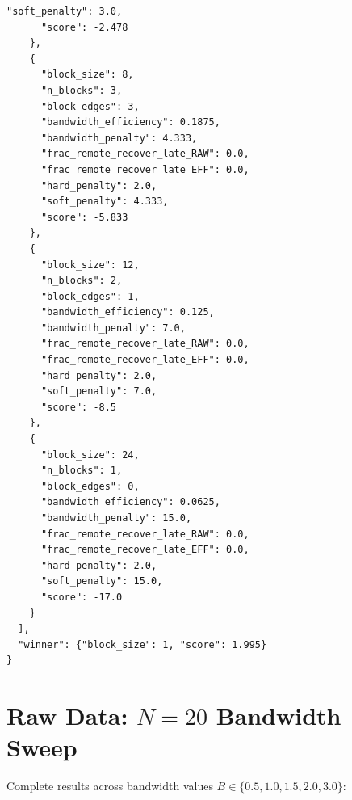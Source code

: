 \documentclass[11pt]{article}
\begin{document}
\begin{lstlisting}[language={},basicstyle=\ttfamily\footnotesize]
      "soft_penalty": 3.0,
      "score": -2.478
    },
    {
      "block_size": 8,
      "n_blocks": 3,
      "block_edges": 3,
      "bandwidth_efficiency": 0.1875,
      "bandwidth_penalty": 4.333,
      "frac_remote_recover_late_RAW": 0.0,
      "frac_remote_recover_late_EFF": 0.0,
      "hard_penalty": 2.0,
      "soft_penalty": 4.333,
      "score": -5.833
    },
    {
      "block_size": 12,
      "n_blocks": 2,
      "block_edges": 1,
      "bandwidth_efficiency": 0.125,
      "bandwidth_penalty": 7.0,
      "frac_remote_recover_late_RAW": 0.0,
      "frac_remote_recover_late_EFF": 0.0,
      "hard_penalty": 2.0,
      "soft_penalty": 7.0,
      "score": -8.5
    },
    {
      "block_size": 24,
      "n_blocks": 1,
      "block_edges": 0,
      "bandwidth_efficiency": 0.0625,
      "bandwidth_penalty": 15.0,
      "frac_remote_recover_late_RAW": 0.0,
      "frac_remote_recover_late_EFF": 0.0,
      "hard_penalty": 2.0,
      "soft_penalty": 15.0,
      "score": -17.0
    }
  ],
  "winner": {"block_size": 1, "score": 1.995}
}
\end{lstlisting}

\section{Raw Data: $N=20$ Bandwidth Sweep}

Complete results across bandwidth values $B \in \{0.5, 1.0, 1.5, 2.0, 3.0\}$:
\end{document}
